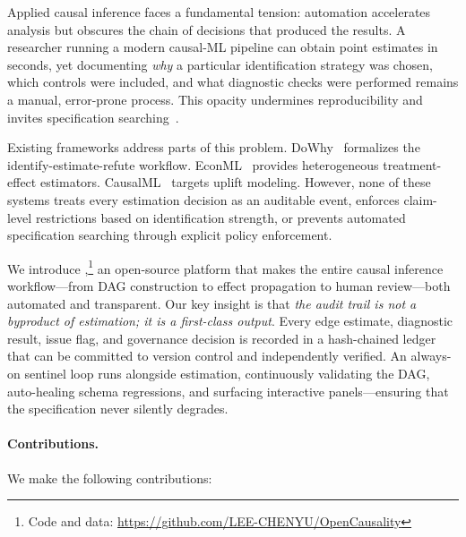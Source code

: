 \documentclass{article}
\begin{document}
Applied causal inference faces a fundamental tension: automation accelerates analysis but obscures the chain of decisions that produced the results. A researcher running a modern causal-ML pipeline can obtain point estimates in seconds, yet documenting \emph{why} a particular identification strategy was chosen, which controls were included, and what diagnostic checks were performed remains a manual, error-prone process. This opacity undermines reproducibility and invites specification searching~\citep{simmons2011false}.

Existing frameworks address parts of this problem. DoWhy~\citep{sharma2020dowhy} formalizes the identify-estimate-refute workflow. EconML~\citep{battocchi2019econml} provides heterogeneous treatment-effect estimators. CausalML~\citep{chen2020causalml} targets uplift modeling. However, none of these systems treats every estimation decision as an auditable event, enforces claim-level restrictions based on identification strength, or prevents automated specification searching through explicit policy enforcement.

We introduce \oc{},\footnote{Code and data: \url{https://github.com/LEE-CHENYU/OpenCausality}} an open-source platform that makes the entire causal inference workflow---from DAG construction to effect propagation to human review---both automated and transparent. Our key insight is that \emph{the audit trail is not a byproduct of estimation; it is a first-class output}. Every edge estimate, diagnostic result, issue flag, and governance decision is recorded in a hash-chained ledger that can be committed to version control and independently verified. An always-on sentinel loop runs alongside estimation, continuously validating the DAG, auto-healing schema regressions, and surfacing interactive panels---ensuring that the specification never silently degrades.

\paragraph{Contributions.} We make the following contributions:
\end{document}
